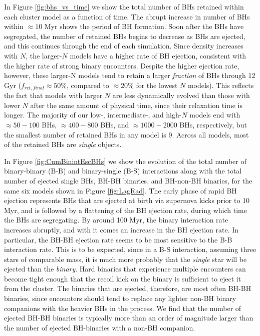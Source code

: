 \documentclass[12pt,preprint]{aastex}
\begin{document}
In Figure \ref{fig:bhs_vs_time} we show the total number of BHs retained within 
each cluster model as a function of time. The abrupt increase in number of BHs within
$\approx 10$ Myr shows the period of BH formation. Soon after the BHs have segregated,
the number of retained BHs begins to decrease as BHs are ejected, and 
this continues through the end of each simulation. Since density increases with $N$, the 
larger-$N$ models have a higher rate of BH ejection, consistent with the higher rate
of strong binary encounters. Despite the higher ejection rate, however, these larger-N
models tend to retain a larger \emph{fraction} of BHs through 12 Gyr ($f_{ret,final}
 \approx 50$\%, compared to $\approx 20$\% for the lowest $N$ models).
This reflects the fact that models with larger $N$ are less dynamically 
evolved than those with lower $N$ after the same amount of physical time, since
their relaxation time is longer. 
The majority of our low-, intermediate-, and high-$N$ models end with $\approx 50-100$ BHs,
$\approx 400-800$ BHs, and $\approx 1000-2000$ BHs, respectively, but the smallest number
of retained BHs in any model is 9. Across all models, most of the retained BHs are \emph{single} objects. 

In Figure \ref{fig:CumBinintEscBHs} we show the evolution of the total number of binary-binary
(B-B) and binary-single (B-S) interactions along with the total number of ejected single BHs, 
BH-BH binaries, and BH-non-BH binaries, for the same six models shown in Figure \ref{fig:LagRad}.
 The early phase of rapid 
BH ejection represents BHs that are ejected at birth via supernova kicks prior to 10 Myr, 
and is followed by a flattening of the BH ejection rate, during which time the BHs
are segregating. By around 100 Myr, the binary 
interaction rate increases abruptly, and with it comes an increase in the BH ejection 
rate. In particular, the BH-BH ejection rate seems to be most sensitive to the B-B 
interaction rate. This is to be expected, since in a B-S interaction, assuming three stars of
comparable mass, it is much more probably that the \emph{single} star will be 
ejected than the \emph{binary}. Hard binaries that experience multiple encounters
can become tight enough that the recoil kick on the binary is sufficient to eject
it from the cluster. The binaries that are ejected, therefore, are most often BH-BH 
binaries, since encounters should tend to replace any lighter non-BH binary 
companions with the heavier BHs in 
the process. We find that the number of ejected BH-BH binaries is typically
more than an order of magnitude larger than the number of ejected BH-binaries with a 
non-BH companion. 
\end{document}
